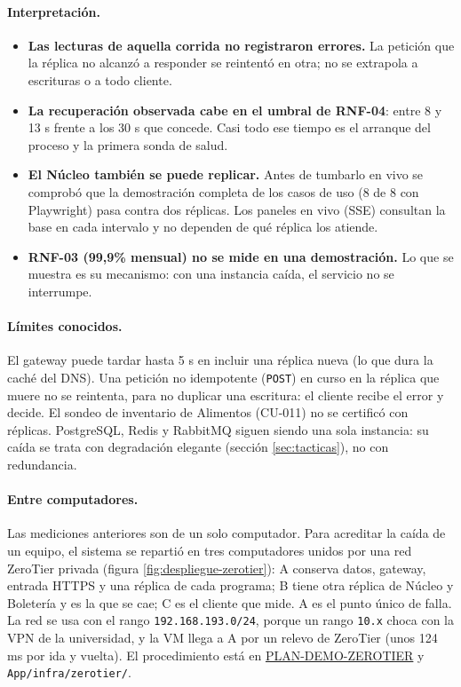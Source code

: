 \paragraph{Interpretación.}
\begin{itemize}
\item \textbf{Las lecturas de aquella corrida no registraron errores.} La petición que la réplica
no alcanzó a responder se reintentó en otra; no se extrapola a escrituras o a todo cliente.
\item \textbf{La recuperación observada cabe en el umbral de RNF-04}: entre 8 y 13 s frente a los 30 s
que concede. Casi todo ese tiempo es el arranque del proceso y la primera sonda de salud.
\item \textbf{El Núcleo también se puede replicar.} Antes de tumbarlo en vivo se comprobó que la
demostración completa de los casos de uso (8 de 8 con Playwright) pasa contra dos réplicas. Los
paneles en vivo (SSE) consultan la base en cada intervalo y no dependen de qué réplica los
atiende.
\item \textbf{RNF-03 (99,9\% mensual) no se mide en una demostración.} Lo que se muestra es su
mecanismo: con una instancia caída, el servicio no se interrumpe.
\end{itemize}

\paragraph{Límites conocidos.} El gateway puede tardar hasta 5 s en incluir una réplica nueva (lo
que dura la caché del DNS). Una petición no idempotente (\texttt{POST}) en curso en la réplica que
muere no se reintenta, para no duplicar una escritura: el cliente recibe el error y decide. El
sondeo de inventario de Alimentos (CU-011) no se certificó con réplicas. PostgreSQL, Redis y
RabbitMQ siguen siendo una sola instancia: su caída se trata con degradación elegante
(sección \ref{sec:tacticas}), no con redundancia.

\paragraph{Entre computadores.} Las mediciones anteriores son de un solo computador.
Para acreditar la caída de un equipo, el sistema se repartió en tres computadores
unidos por una red ZeroTier privada (figura \ref{fig:despliegue-zerotier}): A conserva
datos, gateway, entrada HTTPS y una réplica de cada programa; B tiene otra réplica de
Núcleo y Boletería y es la que se cae; C es el cliente que mide. A es el punto único
de falla. La red se usa con el rango \texttt{192.168.193.0/24}, porque un rango
\texttt{10.x} choca con la VPN de la universidad, y la VM llega a A por un relevo de
ZeroTier (unos 124 ms por ida y vuelta). El procedimiento está en
\href{https://github.com/Emperador24/HEXACORE/blob/main/Documentation/Work/PLAN-DEMO-ZEROTIER.md}{PLAN-DEMO-ZEROTIER}
y \texttt{App/infra/zerotier/}.

